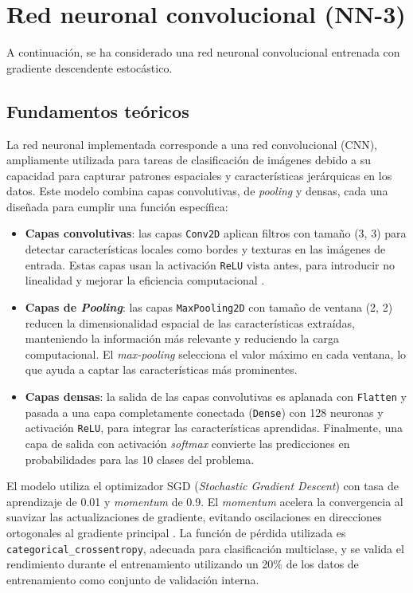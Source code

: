 \newpage
\section{Red neuronal convolucional (NN-3)}

A continuación, se ha considerado una red neuronal convolucional entrenada con gradiente descendente estocástico.

\subsection{Fundamentos teóricos}

La red neuronal implementada corresponde a una red convolucional (CNN), ampliamente utilizada para tareas de clasificación de imágenes debido a su capacidad para capturar patrones espaciales y características jerárquicas en los datos. Este modelo combina capas convolutivas, de \textit{pooling} y densas, cada una diseñada para cumplir una función específica:

\begin{itemize}
	\item \textbf{Capas convolutivas}: las capas \texttt{Conv2D} aplican filtros con tamaño (3, 3) para detectar características locales como bordes y texturas en las imágenes de entrada. Estas capas usan la activación \texttt{ReLU} vista antes, para introducir no linealidad y mejorar la eficiencia computacional \parencite{nair2010relu}.
	\item \textbf{Capas de \textit{Pooling}}: las capas \texttt{MaxPooling2D} con tamaño de ventana (2, 2) reducen la dimensionalidad espacial de las características extraídas, manteniendo la información más relevante y reduciendo la carga computacional. El \textit{max-pooling} selecciona el valor máximo en cada ventana, lo que ayuda a captar las características más prominentes.
	\item \textbf{Capas densas}: la salida de las capas convolutivas es aplanada con \texttt{Flatten} y pasada a una capa completamente conectada (\texttt{Dense}) con 128 neuronas y activación \texttt{ReLU}, para integrar las características aprendidas. Finalmente, una capa de salida con activación \textit{softmax} convierte las predicciones en probabilidades para las 10 clases del problema.
\end{itemize}

El modelo utiliza el optimizador SGD (\textit{Stochastic Gradient Descent}) con tasa de aprendizaje de 0.01 y \textit{momentum} de 0.9. El \textit{momentum} acelera la convergencia al suavizar las actualizaciones de gradiente, evitando oscilaciones en direcciones ortogonales al gradiente principal \parencite{sutskever2013momentum}. La función de pérdida utilizada es \texttt{categorical\_crossentropy}, adecuada para clasificación multiclase, y se valida el rendimiento durante el entrenamiento utilizando un 20\% de los datos de entrenamiento como conjunto de validación interna.

